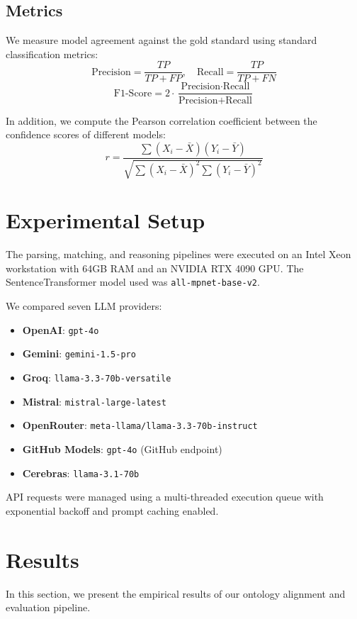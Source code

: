 \documentclass[journal,compsoc]{IEEEtran}
\begin{document}
\begin{itemize}
\subsection{Metrics}
We measure model agreement against the gold standard using standard classification metrics:
\begin{equation}
\text{Precision} = \frac{TP}{TP + FP}, \quad \text{Recall} = \frac{TP}{TP + FN}
\end{equation}
\begin{equation}
\text{F1-Score} = 2 \cdot \frac{\text{Precision} \cdot \text{Recall}}{\text{Precision} + \text{Recall}}
\end{equation}

In addition, we compute the Pearson correlation coefficient between the confidence scores of different models:
\begin{equation}
r = \frac{\sum (X_i - \bar{X})(Y_i - \bar{Y})}{\sqrt{\sum (X_i - \bar{X})^2 \sum (Y_i - \bar{Y})^2}}
\end{equation}

\section{Experimental Setup}
The parsing, matching, and reasoning pipelines were executed on an Intel Xeon workstation with 64GB RAM and an NVIDIA RTX 4090 GPU. The SentenceTransformer model used was \texttt{all-mpnet-base-v2}.

We compared seven LLM providers:
\begin{itemize}
    \item \textbf{OpenAI}: \texttt{gpt-4o}
    \item \textbf{Gemini}: \texttt{gemini-1.5-pro}
    \item \textbf{Groq}: \texttt{llama-3.3-70b-versatile}
    \item \textbf{Mistral}: \texttt{mistral-large-latest}
    \item \textbf{OpenRouter}: \texttt{meta-llama/llama-3.3-70b-instruct}
    \item \textbf{GitHub Models}: \texttt{gpt-4o} (GitHub endpoint)
    \item \textbf{Cerebras}: \texttt{llama-3.1-70b}
\end{itemize}
API requests were managed using a multi-threaded execution queue with exponential backoff and prompt caching enabled.

\section{Results}
In this section, we present the empirical results of our ontology alignment and evaluation pipeline.


\end{itemize}
\end{document}
